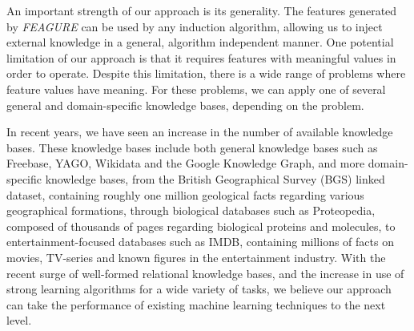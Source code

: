\documentclass[twoside,11pt]{article}
\theoremstyle{definition}
\begin{document}
An important strength of our approach is its generality. The features generated by \emph{FEAGURE} can be used by any induction algorithm, allowing us to inject external knowledge in a general, algorithm independent manner.
One potential limitation of our approach is that it requires features with meaningful values in order to operate. 
Despite this limitation, there is a wide range of problems where feature values have meaning. For these problems, we can apply one of several general and domain-specific knowledge bases, depending on the problem.

In recent years, we have seen an increase in the number of available knowledge bases. These knowledge bases include both general knowledge bases such as Freebase, YAGO, Wikidata and the Google Knowledge Graph, and more domain-specific knowledge bases,  from the British Geographical Survey (BGS) linked dataset, containing roughly one million geological facts regarding various geographical formations, through biological databases such as Proteopedia, composed of thousands of pages regarding biological proteins and molecules, to entertainment-focused databases such as IMDB, containing millions of facts on movies, TV-series and known figures in the entertainment industry. 
With the recent surge of well-formed relational knowledge bases,
and the increase in use of strong learning algorithms for a wide variety of tasks,
we believe our approach can take the performance of existing machine learning techniques to the next level.

\clearpage
\vskip 0.2in


\end{document}
